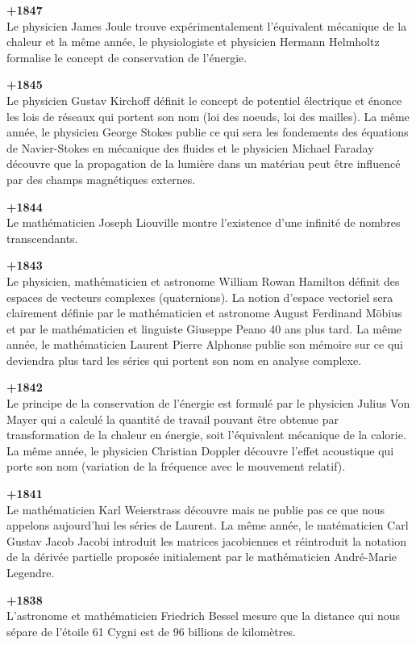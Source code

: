 \textbf{+1847}\\
Le physicien James Joule trouve expérimentalement l'équivalent mécanique de la chaleur et la même année, le physiologiste et physicien Hermann Helmholtz formalise le concept de conservation de l'énergie.

\textbf{+1845}\\
Le physicien Gustav Kirchoff définit le concept de potentiel électrique et énonce les lois de réseaux qui portent son nom (loi des noeuds, loi des mailles). La même année, le physicien George Stokes publie ce qui sera les fondements des équations de Navier-Stokes en mécanique des fluides et le physicien Michael Faraday découvre que la propagation de la lumière dans un matériau peut être influencé par des champs magnétiques externes.

\textbf{+1844}\\
Le mathématicien Joseph Liouville montre l'existence d'une infinité de nombres transcendants.

\textbf{+1843}\\
Le physicien, mathématicien et astronome William Rowan Hamilton définit des espaces de vecteurs complexes (quaternions). La notion d'espace vectoriel sera clairement définie par le mathématicien et astronome August Ferdinand Möbius et par le mathématicien et linguiste Giuseppe Peano $40$ ans plus tard. La même année, le mathématicien Laurent Pierre Alphonse publie son mémoire sur ce qui deviendra plus tard les séries qui portent son nom en analyse complexe.

\textbf{+1842}\\
Le principe de la conservation de l'énergie est formulé par le physicien Julius Von Mayer qui a calculé la quantité de travail pouvant être obtenue par transformation de la chaleur en énergie, soit l'équivalent mécanique de la calorie. La même année, le physicien Christian Doppler découvre l'effet acoustique qui porte son nom (variation de la fréquence avec le mouvement relatif).

\textbf{+1841}\\
Le mathématicien Karl Weierstrass découvre mais ne publie pas ce que nous appelons aujourd'hui les séries de Laurent. La même année, le matématicien Carl Gustav Jacob Jacobi introduit les matrices jacobiennes et réintroduit la notation de la dérivée partielle proposée initialement par le mathématicien André-Marie Legendre.

\textbf{+1838}\\
L'astronome et mathématicien Friedrich Bessel mesure que la distance qui nous sépare de l'étoile 61 Cygni est de 96 billions de kilomètres.

